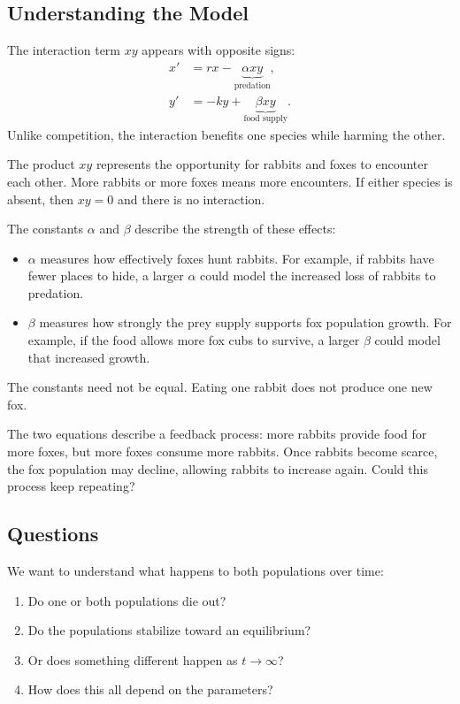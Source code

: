 \documentclass[10pt,letterpaper]{article}
\begin{document}
\subsection{Understanding the Model}

The interaction term $xy$ appears with opposite signs:
\[
\begin{aligned}
x'&=rx-\underbrace{\alpha xy}_{\text{predation}},\\[6pt]
y'&=-ky+\underbrace{\beta xy}_{\text{food supply}}.
\end{aligned}
\]
Unlike competition, the interaction benefits one species
while harming the other.

The product $xy$ represents the opportunity for rabbits
and foxes to encounter each other. More rabbits or more
foxes means more encounters. If either species is absent,
then $xy=0$ and there is no interaction.

The constants $\alpha$ and $\beta$ describe the strength
of these effects:
\begin{itemize}
    \item $\alpha$ measures how effectively foxes hunt
    rabbits. For example, if rabbits have fewer places
    to hide, a larger $\alpha$ could model the increased
    loss of rabbits to predation.

    \item $\beta$ measures how strongly the prey supply
    supports fox population growth. For example, if
    the food allows more fox cubs to survive, a larger
    $\beta$ could model that increased growth.
\end{itemize}
The constants need not be equal. Eating one rabbit
does not produce one new fox.

The two equations describe a feedback process:
more rabbits provide food for more foxes, but more
foxes consume more rabbits. Once rabbits become scarce,
the fox population may decline, allowing rabbits
to increase again. Could this process keep repeating?

\subsection{Questions}

We want to understand what happens to both populations
over time:
\begin{enumerate}
    \item Do one or both populations die out?

    \item Do the populations stabilize toward an equilibrium? 

    \item Or does something different happen as $t\to\infty$?

    \item How does this all depend on the parameters?
\end{enumerate}
\end{document}
